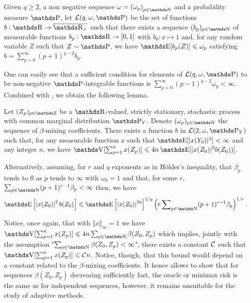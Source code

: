 \begin{de}\label{DE_FUNCSPACE_INTRO_DATA_REGULAR}
Given $q \geq 2$, a non negative sequence $\omega = \left(\omega_{p}\right)_{p \in \N}$ and a probability measure $\P$, let $\mathcal{L}(q, \omega, \P)$ be the set of functions $b : \R \rightarrow \overline{\R_{+}}$ such that there exists a sequence $(b_{p})_{p \in \N}$ of measurable functions $b_{p}: \R \rightarrow [0, 1]$ with $b_{0}: x \mapsto 1$ and, for any random variable $Z$ such that $Z \sim \P$, we have $\E[b_{p}(Z)] \leq \omega_{p}$ satisfying $b = \sum\nolimits_{p = 0}^{\infty} (p + 1)^{q - 2} b_{p}$.
\assEnd
\end{de}

One can easily see that a sufficient condition for elements of $\mathcal{L}(q, \omega, \P)$ to be non-negative $\P$-integrable functions is $\sum\nolimits_{p = 0}^{\infty} (p - 1)^{q-2} \omega_{p} < \infty$.
Combined with , we obtain the following lemma.

\begin{lm}\label{LMII_INTRO_DATA_REGULAR}\label{LM_DEPENDENTDATA_VARIANCEBOUNDII}
Let $(Z_{p})_{p \in \Z}$ be a $\R$-valued, strictly stationary, stochastic process with common marginal distribution $\P_{Y}$.
Denote $(\omega_{p})_{p \in \N}$ the sequence of $\beta$-mixing coefficients.
There exists a function $b$ in $\mathcal{L}(2, \omega, \P_{Y})$ such that, for any measurable function $x$ such that $\E[\vert x(Y_{0}) \vert^{2}] < \infty$ and any integer $n$, we have $\V[\sum_{p = 1}^{n} x(Z_{p})] \leq 4 n \E[\vert x(Z_{0}) \vert^{2} b(Z_{0}))]$.


Alternatively, assuming, for $r$ and $q$ exponents as in Hölder's inequality, that $\beta_{p}$ tends to $0$ as $p$ tends to $\infty$ with $\omega_{0} = 1$ and that, for some $r$, $\sum\nolimits_{p \in \N} (p+1)^{r-1} \beta_{p} < \infty$ then, we have
\[\E\left[\left\vert x(Z_{0})\right\vert^{2} b(Z_{0})\right] \leq \E\left[\left\vert x(Z_{0})\right\vert^{2q}\right]^{1/q} \left(r \sum\nolimits_{p \in \N} (p+1)^{r-1} \beta_{p}\right)^{1/r}.\]
\reEnd
\end{lm}

Notice, once again, that with $\Vert x \Vert_{\infty} = 1$ we have $\V[\sum_{p = 1}^{n} x(Z_{p})] \leq 4 n \sum_{p \in \N} \beta(Z_{0}, Z_{p})$ which implies, jointly with the assumption "$\sum_{p \in \N} \beta(Z_{0}, Z_{p}) < \infty$",  there exists a constant ${\mathcal C}^{}_{}$ such that $\V[\sum_{p = 1}^{n} x(Z_{p})] \leq \cst{} n$.
Notice, though, that this bound would depend on a constant related to the $\beta$-mixing coefficients.
It hence allows to show that for sequences $\beta(Z_{0}, Z_{p})$ decreasing sufficiently fast, the oracle or minimax risk is the same as for independent sequences, however, it remains unsuitable for the study of adaptive methods.

